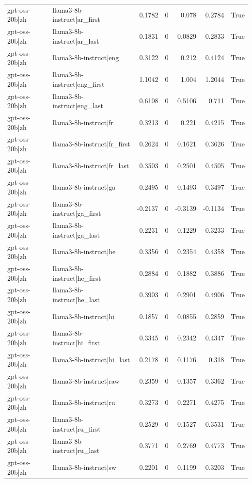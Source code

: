 \begin{table}
\begin{tabular}{l l r r r r l}
gpt-oss-20b|zh & llama3-8b-instruct|ar_first & 0.1782 & 0 & 0.078 & 0.2784 & True \\
gpt-oss-20b|zh & llama3-8b-instruct|ar_last & 0.1831 & 0 & 0.0829 & 0.2833 & True \\
gpt-oss-20b|zh & llama3-8b-instruct|eng & 0.3122 & 0 & 0.212 & 0.4124 & True \\
gpt-oss-20b|zh & llama3-8b-instruct|eng_first & 1.1042 & 0 & 1.004 & 1.2044 & True \\
gpt-oss-20b|zh & llama3-8b-instruct|eng_last & 0.6108 & 0 & 0.5106 & 0.711 & True \\
gpt-oss-20b|zh & llama3-8b-instruct|fr & 0.3213 & 0 & 0.221 & 0.4215 & True \\
gpt-oss-20b|zh & llama3-8b-instruct|fr_first & 0.2624 & 0 & 0.1621 & 0.3626 & True \\
gpt-oss-20b|zh & llama3-8b-instruct|fr_last & 0.3503 & 0 & 0.2501 & 0.4505 & True \\
gpt-oss-20b|zh & llama3-8b-instruct|ga & 0.2495 & 0 & 0.1493 & 0.3497 & True \\
gpt-oss-20b|zh & llama3-8b-instruct|ga_first & -0.2137 & 0 & -0.3139 & -0.1134 & True \\
gpt-oss-20b|zh & llama3-8b-instruct|ga_last & 0.2231 & 0 & 0.1229 & 0.3233 & True \\
gpt-oss-20b|zh & llama3-8b-instruct|he & 0.3356 & 0 & 0.2354 & 0.4358 & True \\
gpt-oss-20b|zh & llama3-8b-instruct|he_first & 0.2884 & 0 & 0.1882 & 0.3886 & True \\
gpt-oss-20b|zh & llama3-8b-instruct|he_last & 0.3903 & 0 & 0.2901 & 0.4906 & True \\
gpt-oss-20b|zh & llama3-8b-instruct|hi & 0.1857 & 0 & 0.0855 & 0.2859 & True \\
gpt-oss-20b|zh & llama3-8b-instruct|hi_first & 0.3345 & 0 & 0.2342 & 0.4347 & True \\
gpt-oss-20b|zh & llama3-8b-instruct|hi_last & 0.2178 & 0 & 0.1176 & 0.318 & True \\
gpt-oss-20b|zh & llama3-8b-instruct|raw & 0.2359 & 0 & 0.1357 & 0.3362 & True \\
gpt-oss-20b|zh & llama3-8b-instruct|ru & 0.3273 & 0 & 0.2271 & 0.4275 & True \\
gpt-oss-20b|zh & llama3-8b-instruct|ru_first & 0.2529 & 0 & 0.1527 & 0.3531 & True \\
gpt-oss-20b|zh & llama3-8b-instruct|ru_last & 0.3771 & 0 & 0.2769 & 0.4773 & True \\
gpt-oss-20b|zh & llama3-8b-instruct|sw & 0.2201 & 0 & 0.1199 & 0.3203 & True \\

\end{tabular}
\end{table}

